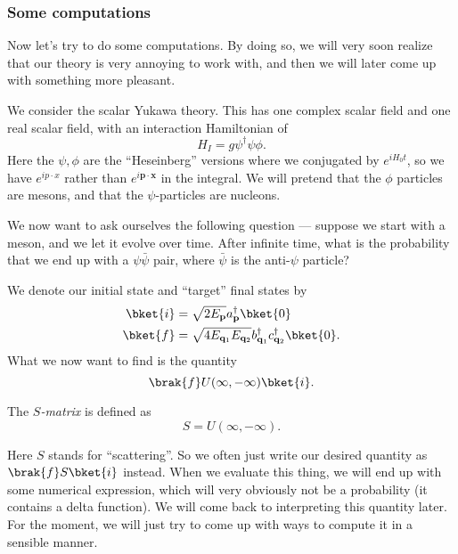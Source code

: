 \documentclass[a4paper]{article}
\begin{document}
\subsubsection*{Some computations}
Now let's try to do some computations. By doing so, we will very soon realize that our theory is very annoying to work with, and then we will later come up with something more pleasant.

We consider the scalar Yukawa theory. This has one complex scalar field and one real scalar field, with an interaction Hamiltonian of
\[
  H_I = g\psi^\dagger \psi \phi.
\]
Here the $\psi, \phi$ are the ``Heseinberg'' versions where we conjugated by $e^{iH_0 t}$, so we have $e^{ip\cdot x}$ rather than $e^{i\mathbf{p}\cdot \mathbf{x}}$ in the integral. We will pretend that the $\phi$ particles are mesons, and that the $\psi$-particles are nucleons.

We now want to ask ourselves the following question --- suppose we start with a meson, and we let it evolve over time. After infinite time, what is the probability that we end up with a $\psi\bar\psi$ pair, where $\bar{\psi}$ is the anti-$\psi$ particle?
\begin{center}
\end{center}
We denote our initial state and ``target'' final states by
\begin{align*}
  \bket{i} &= \sqrt{2E_\mathbf{p}} a_\mathbf{p}^\dagger \bket{0}\\
  \bket{f} &= \sqrt{4E_{\mathbf{q}_1} E_{\mathbf{q}_2}} b_{\mathbf{q}_1}^\dagger c_{\mathbf{q}_2}^{\dagger} \bket{0}.
\end{align*}
What we now want to find is the quantity
\[
  \brak{f}U(\infty, -\infty)\bket{i}.
\]
\begin{defi}[$S$-matrix]
  The \emph{$S$-matrix} is defined as
  \[
    S = U(\infty, -\infty).
  \]
\end{defi}
Here $S$ stands for ``scattering''. So we often just write our desired quantity as $\brak{f}S\bket{i}$ instead. When we evaluate this thing, we will end up with some numerical expression, which will very obviously not be a probability (it contains a delta function). We will come back to interpreting this quantity later. For the moment, we will just try to come up with ways to compute it in a sensible manner.
\end{document}

